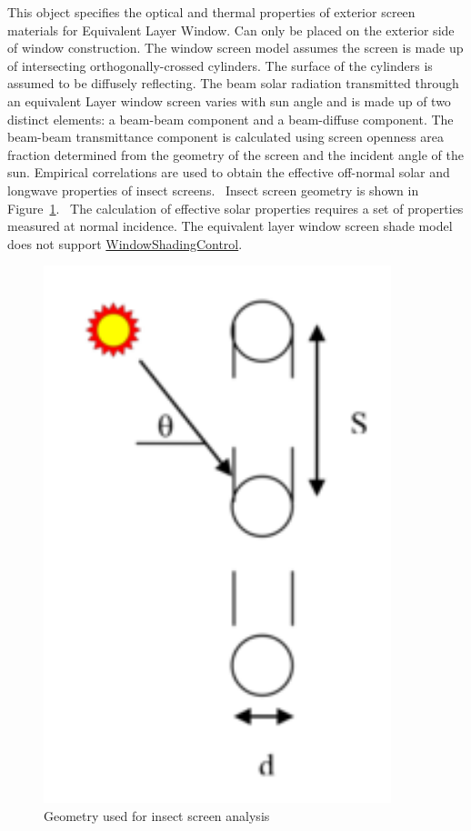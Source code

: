 This object specifies the optical and thermal properties of exterior screen materials for Equivalent Layer Window. Can only be placed on the exterior side of window construction. The window screen model assumes the screen is made up of intersecting orthogonally-crossed cylinders. The surface of the cylinders is assumed to be diffusely reflecting. The beam solar radiation transmitted through an equivalent Layer window screen varies with sun angle and is made up of two distinct elements: a beam-beam component and a beam-diffuse component. The beam-beam transmittance component is calculated using screen openness area fraction determined from the geometry of the screen and the incident angle of the sun. Empirical correlations are used to obtain the effective off-normal solar and longwave properties of insect screens.~ Insect screen geometry is shown in Figure~\ref{fig:geometry-used-for-insect-screen-analysis}.~ The calculation of effective solar properties requires a set of properties measured at normal incidence. The equivalent layer window screen shade model does not support \hyperref[windowpropertyshadingcontrol]{WindowShadingControl}.

\begin{figure}[hbtp] %
\centering
\includegraphics[width=0.9\textwidth, height=0.9\textheight, keepaspectratio=true]{media/image048.png}
\caption{Geometry used for insect screen analysis \protect \label{fig:geometry-used-for-insect-screen-analysis}}
\end{figure}

